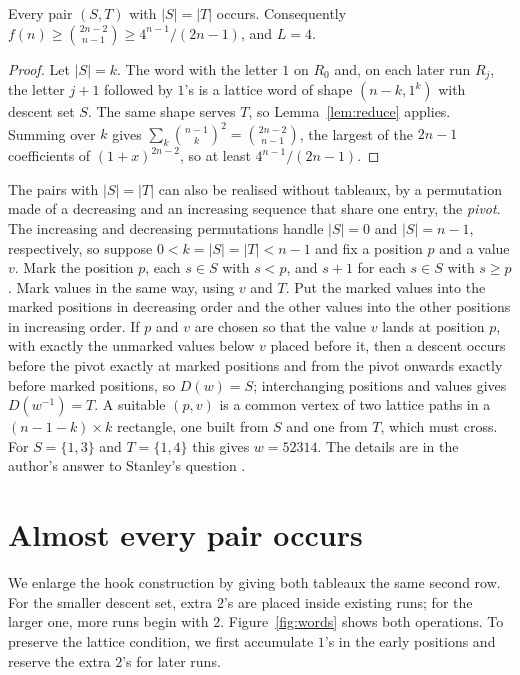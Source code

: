 \documentclass[12pt]{article}
\numberwithin{theorem}{section}
\numberwithin{equation}{section}
\begin{document}
\begin{proposition}\label{prop:hooks}
Every pair $(S,T)$ with $|S|=|T|$ occurs. Consequently $f(n)\ge\binom{2n-2}{n-1}\ge 4^{n-1}/(2n-1)$, and
$L=4$.
\end{proposition}

\begin{proof}
Let $|S|=k$. The word with the letter $1$ on $R_0$ and, on each later run $R_j$, the letter $j+1$ followed
by $1$'s is a lattice word of shape $(n-k,1^k)$ with descent set $S$. The same shape serves $T$, so
Lemma~\ref{lem:reduce} applies. Summing over $k$ gives $\sum_k\binom{n-1}{k}^2=\binom{2n-2}{n-1}$, the
largest of the $2n-1$ coefficients of $(1+x)^{2n-2}$, so at least $4^{n-1}/(2n-1)$.
\end{proof}

\begin{remark}\label{rem:elementary}
The pairs with $|S|=|T|$ can also be realised without tableaux, by a permutation made of a decreasing and an
increasing sequence that share one entry, the \emph{pivot}. The increasing and decreasing permutations handle $|S|=0$ and $|S|=n-1$, respectively, so suppose $0<k=|S|=|T|<n-1$ and fix a position $p$
and a value $v$. Mark the position $p$, each $s\in S$ with $s<p$, and $s+1$ for each $s\in S$ with $s\ge p$.
Mark values in the same way, using $v$ and $T$. Put the marked values into the marked positions in
decreasing order and the other values into the other positions in increasing order. If $p$ and $v$ are
chosen so that the value $v$ lands at position $p$, with exactly the unmarked values below $v$ placed before it,
then a descent occurs before the pivot exactly at marked positions and from the pivot onwards exactly before
marked positions, so $D(w)=S$; interchanging positions and values gives $D(w^{-1})=T$. A suitable $(p,v)$ is
a common vertex of two lattice paths in a $(n-1-k)\times k$ rectangle, one built from $S$ and one from $T$,
which must cross. For $S=\{1,3\}$ and $T=\{1,4\}$ this gives $w=52314$. The details are in the author's
answer to Stanley's question \cite{answerMO}.
\end{remark}

\section{Almost every pair occurs}\label{sec:density}

We enlarge the hook construction by giving both tableaux the same second row. For the smaller descent set, extra $2$'s are placed inside existing runs; for the larger one, more runs begin with $2$. Figure~\ref{fig:words} shows both operations. To preserve the lattice condition, we first accumulate $1$'s in the early positions and reserve the extra $2$'s for later runs.
\end{document}
